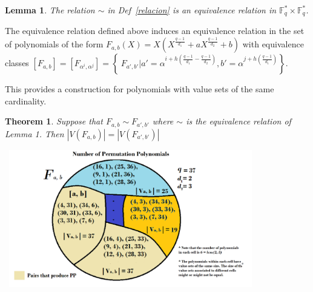 \documentclass[landscape,final,paperwidth=48in,paperheight=36in]{baposter}
\newtheorem*{example*}{Example}
\newtheorem{lemma}{Lemma}
\newtheorem{theorem}{Theorem}
\begin{document}
\begin{poster}
{\begin{lemma}
  
  The relation $\sim$ in Def~\ref{relacion} is an equivalence relation in $\mathbb{F}_q^* \times \mathbb{F}_q^*$.

\end{lemma}


  The equivalence relation defined above induces an equivalence relation in the set of polynomials of the form $F_{a,b}(X) = X(X^{\frac{q-1}{d_1}} + aX^{\frac{q-1}{d_2}} +b)$ with equivalence classes $[F_{a,b}] = [F_{\alpha^i, \alpha^j}] = \left\{\ F_{a',b'} | a' = \alpha^{i+h(\frac{q-1}{d_1} - \frac{q-1}{d_2})}, b' = \alpha^{j+h(\frac{q-1}{d_1})} \right\}$.

  This provides a construction for polynomials with value sets of the same cardinality. 
\begin{theorem}
  
  Suppose that $F_{a,b} \sim F_{a',b'}$ where $\sim$ is the equivalence relation of Lemma 1. Then $|V(F_{a,b})| = |V(F_{a',b'})|$

\end{theorem}

\includegraphics[width=11cm, height=6cm]{clases}

}\label{Results}

\end{poster}
\end{document}
